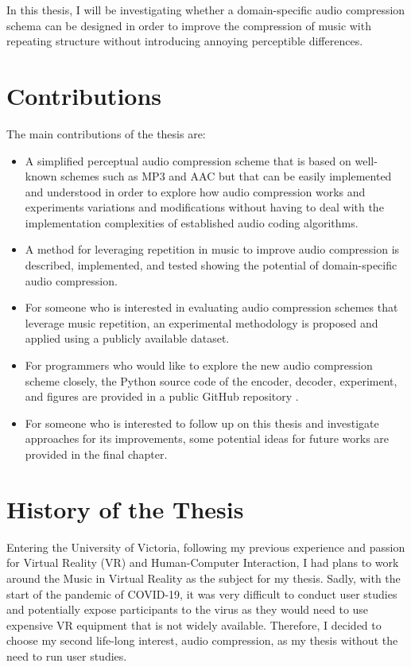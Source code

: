 In this thesis, I will be investigating whether a domain-specific audio compression schema can be designed in order to improve the compression of music with repeating structure without introducing annoying perceptible differences.


\section{Contributions}

The main contributions of the thesis are: 


\begin{itemize}
\item A simplified perceptual audio compression scheme that is based on well-known schemes such as MP3 and AAC but that can be easily implemented and understood in order to explore how audio compression works and experiments variations and modifications without having to deal with the implementation complexities 
of established audio coding algorithms. 

\item A method for leveraging repetition in music to improve audio compression is described, implemented, and tested showing the potential of domain-specific audio compression. 

\item For someone who is interested in evaluating audio compression schemes that leverage music repetition, an experimental methodology is proposed and applied using a 
publicly available dataset. 

\item For programmers who would like to explore the new audio compression scheme closely, the Python source code of the encoder, decoder, experiment, and figures are provided in a public GitHub repository  .

\item For someone who is interested to follow up on this thesis and investigate approaches for its improvements, some potential ideas for future works are provided in the final chapter.
\end{itemize}

\section{History of the Thesis}

Entering the University of Victoria, following my previous experience and passion for Virtual Reality (VR) and Human-Computer Interaction, I had plans to work around the Music in Virtual Reality as the subject for my thesis. Sadly, with the start of the pandemic of COVID-19, it was very difficult to conduct user studies and potentially expose participants to the virus 
as they would need to use expensive VR equipment that is not widely available. Therefore, I decided to choose my second life-long interest, audio compression, as my thesis without the need to run user studies.

